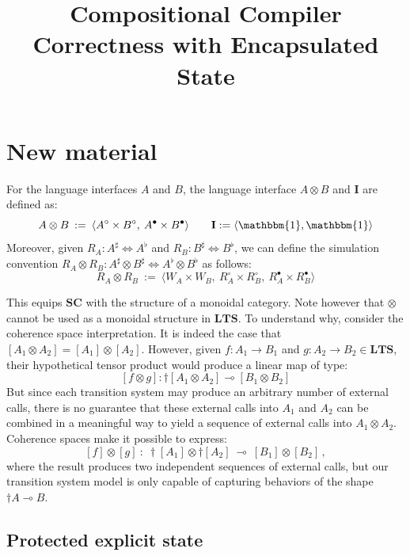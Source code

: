 \documentclass[acmsmall,screen,review,anonymous]{acmart}
\title{Compositional Compiler Correctness with Encapsulated State}
\newcommand{\que}{\circ}
\newcommand{\ans}{\bullet}
\begin{document}
\maketitle

\section*{New material}

\begin{definition} \label{def:sctens}
For the language interfaces $A$ and $B$,
the language interface $A \otimes B$ and $\mathbf{I}$
are defined as:
\[
  A \otimes B \::=\:
  \langle
    A^\que \times B^\que, \:
    A^\ans \times B^\ans
  \rangle
  \qquad
  \mathbf{I} := \langle \mathbbm{1}, \mathbbm{1} \rangle
\]
Moreover,
given $R_A : A^\sharp \Leftrightarrow A^\flat$
and $R_B : B^\sharp \Leftrightarrow B^\flat$,
we can define the simulation convention
$R_A \otimes R_B : A^\sharp \otimes B^\sharp
  \Leftrightarrow
  A^\flat \otimes B^\flat$
as follows:
\[
  R_A \otimes R_B \: := \:
    \big\langle
      W_A \times W_B, \:
      R_A^\que \times R_B^\que, \:
      R_A^\ans \times R_B^\ans
    \big\rangle
\]
\end{definition}

This equips $\mathbf{SC}$
with the structure of a monoidal category.
Note however that $\otimes$
cannot be used as a monoidal structure in $\mathbf{LTS}$.
To understand why, consider the coherence space interpretation.
It is indeed the case that $[A_1 \otimes A_2] = [A_1] \otimes [A_2]$.
However,
given $f : A_1 \rightarrow B_1$
and $g : A_2 \rightarrow B_2 \in \mathbf{LTS}$,
their hypothetical tensor product would produce
a linear map of type:
\[
  [f \otimes g] :
    \dagger [A_1 \otimes A_2] \multimap [B_1 \otimes B_2]
\]
But since each transition system
may produce an arbitrary number of external calls,
there is no guarantee that these external calls
into $A_1$ and $A_2$
can be combined in a meaningful way
to yield a sequence of external calls
into $A_1 \otimes A_2$.
Coherence spaces make it possible to express:
\[
  [f] \otimes [g] \::\:
    \dagger [A_1] \otimes \dagger [A_2] \:\multimap\:
    [B_1] \otimes [B_2]
  \,,
\]
where the result produces two independent sequences of external calls,
but our transition system model
is only capable of capturing behaviors of the shape
$\dagger A \multimap B$.

\subsection*{Protected explicit state}
\end{document}
